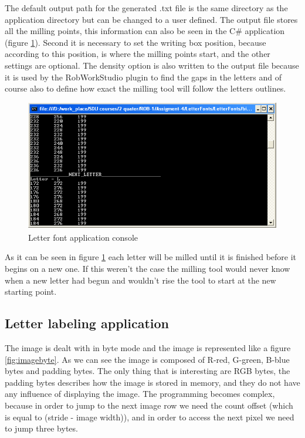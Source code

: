 The default output path for the generated .txt file is the same directory as the application directory but can be changed to a user defined. The output file stores all the milling points, this information can also be seen in the C\# application (figure \ref{fig:letterconsole}). Second it is necessary to set the writing box position, because according to this position, is where the milling points start, and the other settings are optional. The density option is also written to the output file because it is used by the RobWorkStudio plugin to find the gaps in the letters and of course also to define how exact the milling tool will follow the letters outlines.

\begin{figure}[H]
  \centering
  \includegraphics[scale= 0.6]{source/letterconsole.png}
  \caption{Letter font application console}
  \label{fig:letterconsole}
\end{figure}

As it can be seen in figure \ref{fig:letterconsole} each letter will be milled until it is finished before it begins on a new one. If this weren't the case the milling tool would never know when a new letter had begun and wouldn't rise the tool to start at the new starting point.

\subsection{Letter labeling application}
The image is dealt with in byte mode and the image is represented like a figure \ref{fig:imagebyte}. As we can see the image is composed of R-red, G-green, B-blue bytes and padding bytes. The only thing that is interesting are RGB bytes, the padding bytes describes how the image is stored in memory, and they do not have any influence of displaying the image. The programming becomes complex, because in order to jump to the next image row we need the count offset (which is equal to (stride - image width)), and in order to access the next pixel we need to jump three bytes.

